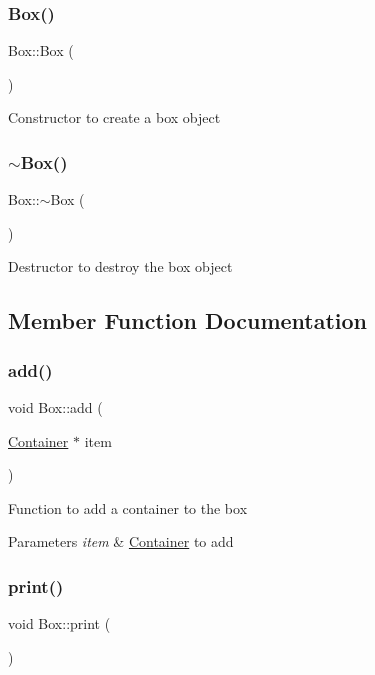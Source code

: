 \subsubsection{\texorpdfstring{Box()}{Box()}}
{\footnotesize\ttfamily Box\+::\+Box (\begin{DoxyParamCaption}{ }\end{DoxyParamCaption})}

Constructor to create a box object \mbox{\label{classBox_a6a5e09398e85d602a046b429062fb9c2}} 
\subsubsection{\texorpdfstring{$\sim$\+Box()}{~Box()}}
{\footnotesize\ttfamily Box\+::$\sim$\+Box (\begin{DoxyParamCaption}{ }\end{DoxyParamCaption})}

Destructor to destroy the box object 

\subsection{Member Function Documentation}
\mbox{\label{classBox_ab556d9a17e15a4a23d7f0950799f1525}} 
\subsubsection{\texorpdfstring{add()}{add()}}
{\footnotesize\ttfamily void Box\+::add (\begin{DoxyParamCaption}\item[{\hyperlink{classContainer}{Container} $\ast$}]{item }\end{DoxyParamCaption})}

Function to add a container to the box 
\begin{DoxyParams}{Parameters}
{\em item} & \hyperlink{classContainer}{Container} to add \\
\hline
\end{DoxyParams}
\mbox{\label{classBox_a7f9cef3d9324289ae0fb4ec1aa50db9d}} 
\subsubsection{\texorpdfstring{print()}{print()}}
{\footnotesize\ttfamily void Box\+::print (\begin{DoxyParamCaption}{ }\end{DoxyParamCaption})\hspace{0.3cm}{\ttfamily [virtual]}}

